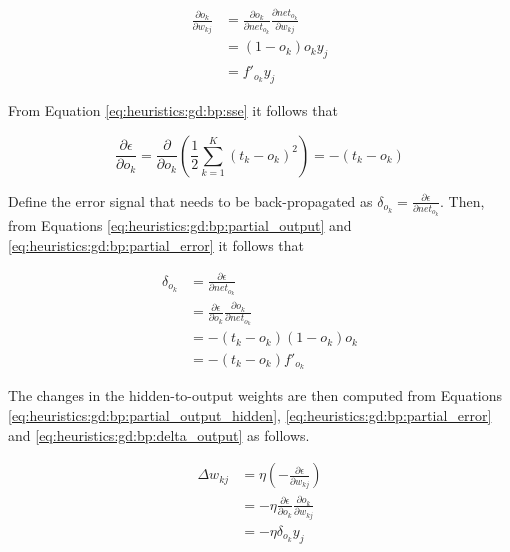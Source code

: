 \begin{equation}
    \label{eq:heuristics:gd:bp:partial_output_hidden}
    \begin{split}
        \frac{\partial o_{k}}{\partial w_{kj}}
        &= \frac{\partial o_{k}}{\partial net_{o_{k}}}\frac{\partial net_{o_{k}}}{\partial w_{kj}}\\
        &= (1 - o_{k})o_{k}y_{j}\\
        &= f'_{o_{k}}y_{j}
    \end{split}
\end{equation}

From Equation \ref{eq:heuristics:gd:bp:sse} it follows that

\begin{equation}
    \label{eq:heuristics:gd:bp:partial_error}
    \frac{\partial \epsilon}{\partial o_{k}} = \frac{\partial}{\partial o_{k}}\left( \frac{1}{2} \sum^{K}_{k=1}(t_{k} - o_{k})^{2} \right) = -(t_{k} - o_{k})
\end{equation}

Define the error signal that needs to be back-propagated as $\delta_{o_{k}} = \frac{\partial \epsilon}{\partial net_{o_{k}}}$. Then, from Equations \ref{eq:heuristics:gd:bp:partial_output} and \ref{eq:heuristics:gd:bp:partial_error} it follows that


\begin{equation}
    \label{eq:heuristics:gd:bp:delta_output}
    \begin{split}
        \delta_{o_{k}}
        &= \frac{\partial \epsilon}{\partial net_{o_{k}}}\\
        &= \frac{\partial \epsilon}{\partial o_{k}}\frac{\partial o_{k}}{\partial net_{o_{k}}}\\
        &= -(t_{k} - o_{k})(1 - o_{k})o_{k}\\
        &= -(t_{k} - o_{k})f'_{o_{k}}
    \end{split}
\end{equation}

The changes in the hidden-to-output weights are then computed from Equations \ref{eq:heuristics:gd:bp:partial_output_hidden}, \ref{eq:heuristics:gd:bp:partial_error} and \ref{eq:heuristics:gd:bp:delta_output} as follows.  

\begin{equation}
    \label{eq:heuristics:gd:bp:delta_hidden_to_output}
    \begin{split}
        \Delta w_{kj}
        &= \eta \left( - \frac{\partial \epsilon}{\partial w_{kj}} \right)\\
        &= -\eta \frac{\partial \epsilon}{\partial o_{k}}\frac{\partial o_{k}}{\partial w_{kj}}\\
        &= -\eta \delta_{o_{k}}y_{j}
    \end{split}
\end{equation}

